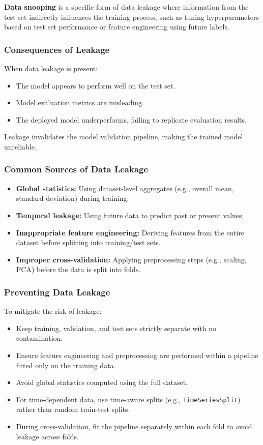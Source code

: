 \documentclass[9pt]{extarticle}
\begin{document}
\textbf{Data snooping} is a specific form of data leakage where information from the test set indirectly influences the training process, such as tuning hyperparameters based on test set performance or feature engineering using future labels.

\subsubsection*{Consequences of Leakage}

When data leakage is present:
\begin{itemize}
    \item The model appears to perform well on the test set.
    \item Model evaluation metrics are misleading.
    \item The deployed model underperforms, failing to replicate evaluation results.
\end{itemize}

Leakage invalidates the model validation pipeline, making the trained model unreliable.

\subsubsection*{Common Sources of Data Leakage}

\begin{itemize}
    \item \textbf{Global statistics:} Using dataset-level aggregates (e.g., overall mean, standard deviation) during training.
    \item \textbf{Temporal leakage:} Using future data to predict past or present values.
    \item \textbf{Inappropriate feature engineering:} Deriving features from the entire dataset before splitting into training/test sets.
    \item \textbf{Improper cross-validation:} Applying preprocessing steps (e.g., scaling, PCA) before the data is split into folds.
\end{itemize}

\subsubsection*{Preventing Data Leakage}

To mitigate the risk of leakage:
\begin{itemize}
    \item Keep training, validation, and test sets strictly separate with no contamination.
    \item Ensure feature engineering and preprocessing are performed within a pipeline fitted only on the training data.
    \item Avoid global statistics computed using the full dataset.
    \item For time-dependent data, use time-aware splits (e.g., \texttt{TimeSeriesSplit}) rather than random train-test splits.
    \item During cross-validation, fit the pipeline separately within each fold to avoid leakage across folds.
\end{itemize}
\end{document}
